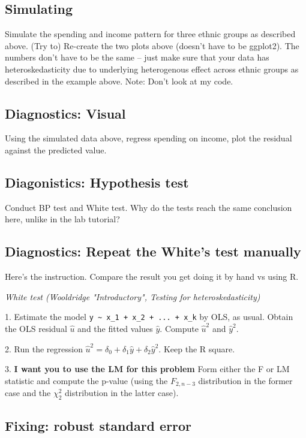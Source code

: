 \documentclass{article}\usepackage[]{graphicx}\usepackage[]{color}
\begin{document}
\subsection{Simulating}

Simulate the spending and income pattern for three ethnic groups as described above. (Try to) Re-create the two plots above (doesn't have to be ggplot2). The numbers don't have to be the same -- just make sure that your data has heteroskedasticity due to underlying heterogenous effect across ethnic groups as described in the example above. Note: Don't look at my code.

\subsection{Diagnostics: Visual}

Using the simulated data above, regress spending on income, plot the residual against the predicted value.

\subsection{Diagonistics: Hypothesis test}

Conduct BP test and White test. Why do the tests reach the same conclusion here, unlike in the lab tutorial?

\subsection{Diagnostics: Repeat the White's test manually}

Here's the instruction. Compare the result you get doing it by hand vs using R.

\textit{White test (Wooldridge "Introductory", Testing for heteroskedasticity)}

1. Estimate the model \verb`y ~ x_1 + x_2 + ... + x_k` by OLS, as usual. Obtain the OLS residual $\hat u$ and the fitted values $\hat y$. Compute $\hat u^2$ and $\hat y^2$.

2. Run the regression $\hat u^2 = \delta_0 + \delta_1 \hat y + \delta_2 \hat y^2$. Keep the R square.

3. \textbf{I want you to use the LM for this problem} Form either the F or LM statistic and compute the p-value (using the $F_{2,n-3}$ distribution in the former case and the $\chi_2^2$ distribution in the latter case).

\subsection{Fixing: robust standard error}
\end{document}
